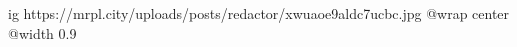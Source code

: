  
 
 
 
 

\ifcmt
  ig https://mrpl.city/uploads/posts/redactor/xwuaoe9aldc7ucbc.jpg
  @wrap center
  @width 0.9
\fi

